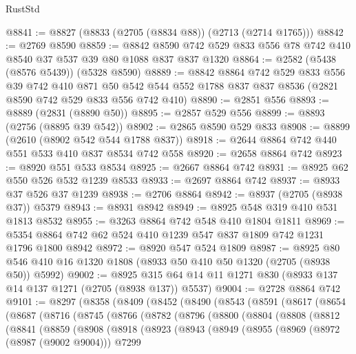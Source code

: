 \begin{lexlean}{RustStd}
\begin{coremodule}
@8841 := @8827 (@8833 (@2705 (@8834 @88)) (@2713 (@2714 @1765)))
@8842 := @2769 @8590
@8859 := @8842 @8590 @742 @529 @833 @556 @78 @742 @410 @8540 @37 @537 @39 @80 @1088 @837 @837 @1320
@8864 := @2582 (@5438 (@8576 @5439)) (@5328 @8590)
@8889 := @8842
    @8864
    @742
    @529
    @833
    @556
    @39
    @742
    @410
    @871
    @50
    @542
    @544
    @552
    @1788
    @837
    @837
    @8536
    (@2821 @8590 @742 @529 @833 @556 @742 @410)
@8890 := @2851 @556
@8893 := @8889 (@2831 (@8890 @50))
@8895 := @2857 @529 @556
@8899 := @8893 (@2756 (@8895 @39 @542))
@8902 := @2865 @8590 @529 @833
@8908 := @8899 (@2610 (@8902 @542 @544 @1788 @837))
@8918 := @2644 @8864 @742 @440 @551 @533 @410 @837 @8534 @742 @558
@8920 := @2658 @8864 @742
@8923 := @8920 @551 @533 @8534
@8925 := @2667 @8864 @742
@8931 := @8925 @62 @550 @526 @532 @1239 @8533
@8933 := @2697 @8864 @742
@8937 := @8933 @37 @526 @37 @1239
@8938 := @2706 @8864
@8942 := @8937 (@2705 (@8938 @37)) @5379
@8943 := @8931 @8942
@8949 := @8925 @548 @319 @410 @531 @1813 @8532
@8955 := @3263 @8864 @742 @548 @410 @1804 @1811
@8969 := @5354 @8864 @742 @62 @524 @410 @1239 @547 @837 @1809 @742 @1231 @1796 @1800 @8942
@8972 := @8920 @547 @524 @1809
@8987 := @8925 @80 @546 @410 @16 @1320 @1808 (@8933 @50 @410 @50 @1320 (@2705 (@8938 @50)) @5992)
@9002 := @8925 @315 @64 @14 @11 @1271 @830 (@8933 @137 @14 @137 @1271 (@2705 (@8938 @137)) @5537)
@9004 := @2728 @8864 @742
@9101 := @8297
    (@8358
      (@8409
        (@8452
          (@8490
            (@8543
              (@8591
                (@8617
                  (@8654
                    (@8687
                      (@8716
                        (@8745
                          (@8766
                            (@8782
                              (@8796
                                (@8800
                                  (@8804
                                    (@8808
                                      (@8812
                                        (@8841
                                          (@8859
                                            (@8908
                                              (@8918
                                                (@8923
                                                  (@8943
                                                    (@8949
                                                      (@8955
                                                        (@8969
                                                          (@8972 (@8987 (@9002 @9004)))
                                                          @7299

\end{coremodule}
\end{lexlean}
